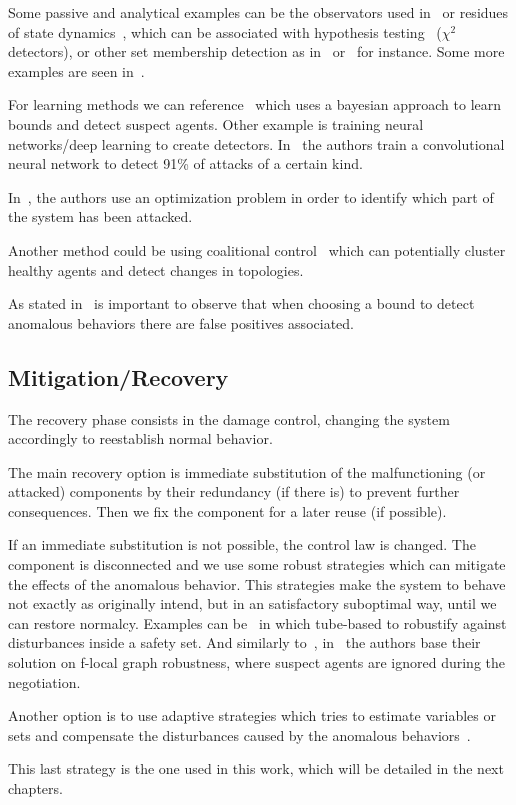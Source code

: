 \documentclass[../main.tex]{subfiles}
\begin{document}
Some passive and analytical examples can be the observators used in~\cite{HoehnZhang2016} or residues of state dynamics~\cite{TeixeiraEtAl2015,BoemEtAl2020}, which can be associated with hypothesis testing~\cite{MoSinopoli2009} ($\chi^{2}$ detectors), or other
set membership detection as in~\cite{FortiEtAl2016} or~\cite{MaestreEtAl2018} for instance.
Some more examples are seen in~\cite{PasqualettiEtAl2012,PasqualettiEtAl2013,ZhangEtAl2021a,ArauzEtAl2021}.

For learning methods we can reference~\cite{AnandutaEtAl2018,AnandutaEtAl2019,AnandutaEtAl2020} which uses
a bayesian approach to learn bounds and detect suspect agents.
Other example is training neural networks/deep learning to create detectors. In~\cite{HussainEtAl2021} the authors train a convolutional neural network to detect 91\% of \dDoS{} attacks of a certain kind.

In~\cite{BraunEtAl2020,BraunEtAl2020a}, the authors use an optimization problem in order to identify which part of the system has been attacked.

Another method could be using coalitional control~\cite{ChanfreutEtAl2021} which can potentially cluster healthy agents and detect changes in topologies.

\begin{remark}\label{rem:bounds_and_error}
As stated in~\cite{ArauzEtAl2021} is important to observe that when choosing a bound to detect anomalous behaviors there are false positives associated.
\end{remark}

\subsection{Mitigation/Recovery}
The recovery phase consists in the damage control, changing the system accordingly to reestablish normal behavior.

The main recovery option is immediate substitution of the malfunctioning (or attacked) components by their redundancy (if there is) to prevent further consequences.
Then we fix the component for a later reuse (if possible).

If an immediate substitution is not possible, the control law is changed.
The component is disconnected and we use some robust strategies which can mitigate the effects of the anomalous behavior.
This strategies make the system to behave not exactly as originally intend, but in an satisfactory suboptimal way, until we can restore normalcy.
Examples can be~\cite{MaestreEtAl2018} in which tube-based \mpc{} to robustify against disturbances inside a safety set.
And similarly to~\cite{VelardeEtAl2018}, in~\cite{AnandutaEtAl2018,AnandutaEtAl2019,AnandutaEtAl2020} the authors base their solution on f-local graph robustness, where suspect agents are ignored during the \dmpc{} negotiation.

Another option is to use adaptive strategies which tries to estimate variables or sets and compensate the disturbances caused by the anomalous behaviors~\cite{YangEtAl2022,LuEtAl2020}.

This last strategy is the one used in this work, which will be detailed in the next chapters.
\end{document}
